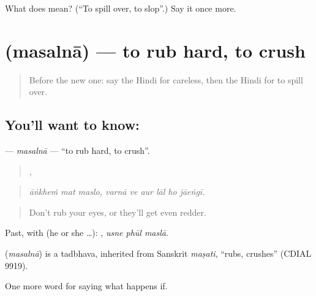 \begin{tcolorbox}[breakable,colback=teal!4,colframe=teal!35!black,title={Before you move on}]
What does  mean? (\textquotedblleft{}To spill over, to slop\textquotedblright{}.) Say it once more.
\end{tcolorbox}
\section[\texorpdfstring{\hi{मसलना} (masalnā)}{मसलना (masalnā)}]{ (masalnā) — to rub hard, to crush}

\label{lesson:HI-C382-masalna}



\begin{quote}
Before the new one: say the Hindi for careless, then the Hindi for to spill over.
\end{quote}

\subsection*{You'll want to know: }
\textbf{} — \emph{masalnā} — \textquotedblleft{}to rub hard, to crush\textquotedblright{}.

\begin{quote}
  ,      
\end{quote}

\begin{quote}
\emph{āṅkheṁ mat maslo, varnā ve aur lāl ho jāeṅgī.}
\end{quote}

\begin{quote}
Don't rub your eyes, or they'll get even redder.
\end{quote}

Past, with  (he or she …):   , \emph{usne phūl maslā}.

\begin{cousinweb}
\textbf{} (\emph{masalnā}) is a tadbhava, inherited from Sanskrit \emph{maṣati}, \textquotedblleft{}rubs, crushes\textquotedblright{} (CDIAL 9919).
\end{cousinweb}

\begin{grammarlens}[title={What you've built}]
One more word for saying what happens if.
\end{grammarlens}

